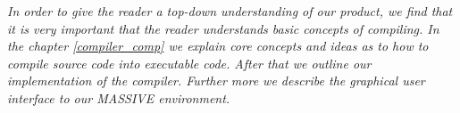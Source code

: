 \textit{In order to give the reader a top-down understanding of our product, we find that it is very important that the reader understands basic concepts of compiling. In the chapter \ref{compiler_comp} we explain core concepts and ideas as to how to compile source code into executable code. After that we outline our implementation of the compiler. Further more we describe the graphical user interface to our MASSIVE environment.}\\ \\